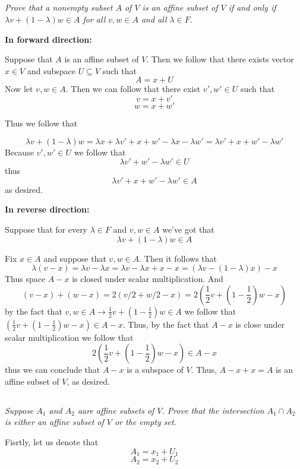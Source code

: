 \documentclass[11pt,oneside,titlepage]{book}
\begin{document}
\subsection{}

\textit{Prove that a nonempty subset $A$ of $V$ is an affine subset of $V$ if and only if
  $\lambda v + (1 - \lambda)w \in A$ for all $v, w \in A$ and all $\lambda \in F$.}

\textbf{In forward direction: }

Suppose that $A$ is an affine subset of $V$. Then we follow that there exists vector
$x \in V$ and subspace $U \subseteq V$ such that
$$A = x + U$$
Now let $v, w \in A$. Then we can follow that there exist $v', w' \in U$ such
that
$$v = x + v'$$
$$w = x + w'$$

Thus we follow that

$$\lambda v + (1 - \lambda) w = \lambda x + \lambda v' + x + w' - \lambda x - \lambda w' =
\lambda v' + x + w' - \lambda w' $$
Because $v', w' \in U$ we follow that
$$\lambda v' + w' - \lambda w' \in U$$
thus
$$\lambda v' + x + w' - \lambda w' \in A$$
as desired.

\textbf{In reverse direction: }

Suppose that for every $\lambda \in F$ and $v, w \in A$ we've got that
$$\lambda v + (1 - \lambda) w \in A $$

Fix $x \in A$ and suppose that $v, w \in A$. Then it follows that
$$ \lambda(v  - x) = \lambda v  - \lambda x =
\lambda v  - \lambda x + x - x =
(\lambda v  - (1 - \lambda) x) - x
$$
Thus space $A - x$ is closed under scalar multiplication. And
$$ (v - x) + (w - x) = 2(v/2 + w/2 - x) = 2(\frac{1}{2} v + (1 - \frac 1 2) w - x) $$
by the fact that $v, w \in A \to \frac{1}{2} v + (1 - \frac 1 2) w \in A$ we follow that
$(\frac{1}{2} v + (1 - \frac 1 2) w - x) \in A - x$. Thus, by the fact that
$A - x$ is close under scalar multiplication we follow that
$$2(\frac{1}{2} v + (1 - \frac 1 2) w - x) \in A - x$$
thus we can conclude that $A - x$ is a subspace of $V$. Thus, $A - x + x = A$ is an affine
subset of $V$, as desired.

\subsection{}

\textit{Suppose $A_1$ and $A_2$ aare affine subsets of $V$. Prove that the intersection
  $A_1 \cap A_2$ is either an affine subset of $V$ or the empty set.}

Fisrtly, let us denote that
$$A_1 = x_1 + U_1$$
$$A_2 = x_2 + U_2$$
\end{document}
